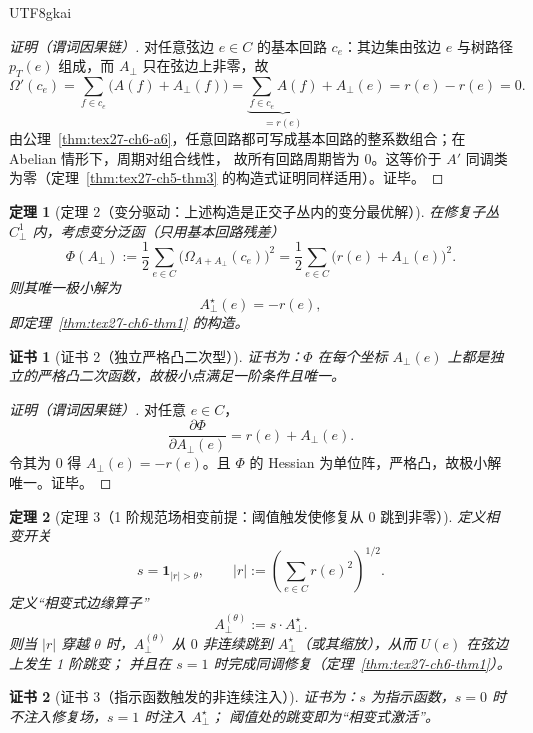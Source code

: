 \documentclass[12pt]{article}
\newtheorem{theorem}{定理}[section]
\newtheorem{Certificate}{证书}[section]
\newcommand{\indicator}[1]{\mathbf{1}_{#1}}
\begin{document}
\begin{CJK*}{UTF8}{gkai}
\begin{proof}[证明（谓词因果链）]
对任意弦边 $e\in C$ 的基本回路 $c_e$：其边集由弦边 $e$ 与树路径 $p_T(e)$ 组成，而 $A_{\perp}$ 只在弦边上非零，故
\[
  \Omega'(c_e)
  =\sum_{f\in c_e}\bigl(A(f)+A_{\perp}(f)\bigr)
  =\underbrace{\sum_{f\in c_e}A(f)}_{=r(e)}+A_{\perp}(e)
  =r(e)-r(e)=0.
\]
由公理~\ref{thm:tex27-ch6-a6}，任意回路都可写成基本回路的整系数组合；在 Abelian 情形下，周期对组合线性，
故所有回路周期皆为 $0$。这等价于 $A'$ 同调类为零（定理~\ref{thm:tex27-ch5-thm3} 的构造式证明同样适用）。证毕。
\end{proof}

\begin{theorem}[定理 2（变分驱动：上述构造是正交子丛内的变分最优解）]
\label{thm:tex27-ch6-thm2}
在修复子丛 $C^1_{\perp}$ 内，考虑变分泛函（只用基本回路残差）
\[
  \Phi(A_{\perp})
  :=\frac12\sum_{e\in C}\Big(\Omega_{A+A_{\perp}}(c_e)\Big)^2
  =\frac12\sum_{e\in C}\big(r(e)+A_{\perp}(e)\big)^2.
\]
则其唯一极小解为
\[
  A_{\perp}^\star(e)=-r(e),
\]
即定理~\ref{thm:tex27-ch6-thm1} 的构造。
\end{theorem}

\begin{Certificate}[证书 2（独立严格凸二次型）]
\label{cert:tex27-ch6-thm2}
证书为：$\Phi$ 在每个坐标 $A_{\perp}(e)$ 上都是独立的严格凸二次函数，故极小点满足一阶条件且唯一。
\end{Certificate}

\begin{proof}[证明（谓词因果链）]
对任意 $e\in C$，
\[
  \frac{\partial\Phi}{\partial A_{\perp}(e)}=r(e)+A_{\perp}(e).
\]
令其为 0 得 $A_{\perp}(e)=-r(e)$。且 $\Phi$ 的 Hessian 为单位阵，严格凸，故极小解唯一。证毕。
\end{proof}

\begin{theorem}[定理 3（1 阶规范场相变前提：阈值触发使修复从 0 跳到非零）]
\label{thm:tex27-ch6-thm3}
定义相变开关
\[
  s=\indicator{|r|>\theta},\qquad |r|:=\left(\sum_{e\in C}r(e)^2\right)^{1/2}.
\]
定义“相变式边缘算子”
\[
  A_{\perp}^{(\theta)} := s\cdot A_{\perp}^\star.
\]
则当 $|r|$ 穿越 $\theta$ 时，$A_{\perp}^{(\theta)}$ 从 $0$ 非连续跳到 $A_{\perp}^\star$（或其缩放），从而 $U(e)$ 在弦边上发生 1 阶跳变；
并且在 $s=1$ 时完成同调修复（定理~\ref{thm:tex27-ch6-thm1}）。
\end{theorem}

\begin{Certificate}[证书 3（指示函数触发的非连续注入）]
\label{cert:tex27-ch6-thm3}
证书为：$s$ 为指示函数，$s=0$ 时不注入修复场，$s=1$ 时注入 $A_{\perp}^\star$；
阈值处的跳变即为“相变式激活”。
\end{Certificate}


\end{CJK*}
\end{document}
